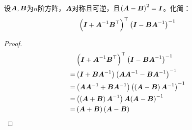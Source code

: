 \begin{suplprob}\label{supl-1.2}
    设\(\mata,\matb\)为\(n\)阶方阵，\(\mata\)对称且可逆，且\(\spar{\mata-\matb}^2=\mati\)。化简：
    \begin{equation*}
        \spar{\mati+\inv{\mata}\matb^\top}^\top\inv{\spar{\mati-\matb\inv{\mata}}}
    \end{equation*}
\end{suplprob}
\begin{proof}
    \begin{align*}
          & \spar{\mati+\inv{\mata}\matb^\top}^\top\inv{\spar{\mati-\matb\inv{\mata}}}         \\
        = & \spar{\mati+\matb\inv{\mata}}\inv{\spar{\mata\inv{\mata}-\matb\inv{\mata}}}        \\
        = & \spar{\mata\inv{\mata}+\matb\inv{\mata}}\inv{\spar{\spar{\mata-\matb}\inv{\mata}}} \\
        = & \spar{\spar{\mata+\matb}\inv{\mata}}\mata\pinv{\mata-\matb}                        \\
        = & \spar{\mata+\matb}\spar{\mata-\matb}
    \end{align*}
\end{proof}